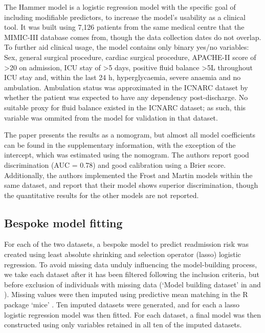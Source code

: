 \documentclass[onecolumn]{article}
\begin{document}
The Hammer model is a logistic regression model with the specific goal of including modifiable predictors, to increase the model's usability as a clinical tool. It was built using 7,126 patients from the same medical centre that the MIMIC-III database comes from, though the data collection dates do not overlap. To further aid clinical usage, the model contains only binary yes/no variables: Sex, general surgical procedure, cardiac surgical procedure, APACHE-II score of >20 on admission, ICU stay of >5 days, positive fluid balance >5L throughout ICU stay and, within the last 24 h, hyperglycaemia, severe anaemia and no ambulation. Ambulation status was approximated in the ICNARC dataset by whether the patient was expected to have any dependency post-discharge. No suitable proxy for fluid balance existed in the ICNARC dataset; as such, this variable was ommited from the model for validation in that dataset.

The paper presents the results as a nomogram, but almost all model coefficients can be found in the supplementary information, with the exception of the intercept, which was estimated using the nomogram. The authors report good discrimination (AUC = 0.78) and good calibration using a Brier score. Additionally, the authors implemented the Frost and Martin models within the same dataset, and report that their model shows superior discrimination, though the quantitative results for the other models are not reported.




\subsection{Bespoke model fitting}

For each of the two datasets, a bespoke model to predict readmission risk was created using least absolute shrinking and selection operator (lasso) logistic regression. To avoid missing data unduly influencing the model-building process, we take each dataset after it has been filtered following the inclusion criteria, but before exclusion of individuals with missing data (`Model building dataset' in  and ). Missing values were then imputed using predictive mean matching in the R package `mice' \citep{Buuren2011}. Ten imputed datasets were generated, and for each a lasso logistic regression model was then fitted. For each dataset, a final model was then constructed using only variables retained in all ten of the imputed datasets. 
\end{document}
